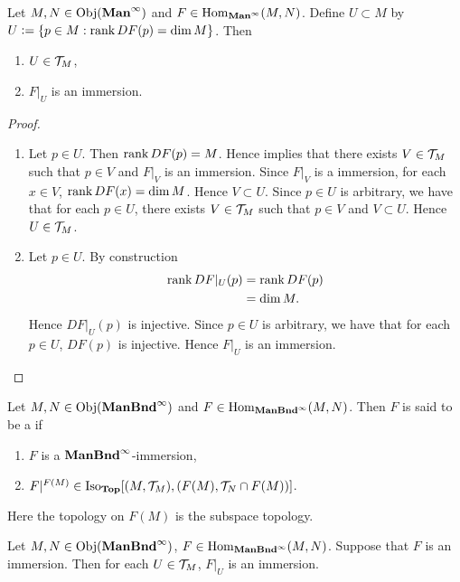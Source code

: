 \documentclass{book}
\begin{document}
	\begin{ex} 
		Let $M, N \in \operatorname{Obj}(\operatorname*{\text{\textbf{Man}}^{\infty}})$ and $F \in \operatorname{Hom}_{\operatorname*{\text{\textbf{Man}}^{\infty}}}(M,N)$. Define $U \subset M$ by $U \vcentcolon= \{p \in M: \operatorname{\text{rank}} DF(p) = \dim M\}$. Then 
		\begin{enumerate}
			\item $U \in \mathcal{T}_M$,
			\item $F|_U$ is an immersion.
		\end{enumerate}
	\end{ex}
	
	\begin{proof}\
		\begin{enumerate}
			\item Let $p \in U$. Then $\operatorname{\text{rank}} DF(p) = M$. Hence  implies that there exists $V \in \mathcal{T}_M$ such that $p \in V$ and $F|_V$ is an immersion. Since $F|_V$ is a immersion, for each $x \in V$, $\operatorname{\text{rank}} DF(x) = \dim M$. Hence $V \subset U$. Since $p \in U$ is arbitrary, we have that for each $p \in U$, there exists $V \in \mathcal{T}_M$ such that $p \in V$ and $V \subset U$. Hence $U \in \mathcal{T}_M$.
			\item Let $p \in U$. By construction  
			\begin{align*}
				\operatorname{\text{rank}} DF|_U(p)
				& = \operatorname{\text{rank}} DF(p) \\ 
				& = \dim M.
			\end{align*}
			Hence $DF|_U(p)$ is injective. Since $p \in U$ is arbitrary, we have that for each $p \in U$, $DF(p)$ is injective. Hence $F|_U$ is an immersion.
		\end{enumerate}
	\end{proof}
	
	\begin{defn}  
		Let $M, N \in \operatorname{Obj}(\operatorname*{\text{\textbf{ManBnd}}^{\infty}})$ and $F \in \operatorname{Hom}_{\operatorname*{\text{\textbf{ManBnd}}^{\infty}}}(M, N)$. Then $F$ is said to be a  if 
		\begin{enumerate}
			\item $F$ is a $\operatorname*{\text{\textbf{ManBnd}}^{\infty}}$-immersion, 
			\item $F|^{F(M)} \in \operatorname{Iso}_{\operatorname*{\text{\textbf{Top}}}}[(M, \mathcal{T}_M), (F(M), \mathcal{T}_N \cap F(M))]$.
		\end{enumerate}	 
	\end{defn}	

	\begin{note}
	Here the topology on $F(M)$ is the subspace topology.
	\end{note}

	\begin{ex} 
		Let $M,N \in \operatorname{Obj}(\operatorname*{\text{\textbf{ManBnd}}^{\infty}})$, $F \in \operatorname{Hom}_{\operatorname*{\text{\textbf{ManBnd}}^{\infty}}}(M,N)$. Suppose that $F$ is an immersion. Then for each $U \in \mathcal{T}_M$, $F|_U$ is an immersion. 
	\end{ex}
\end{document}
